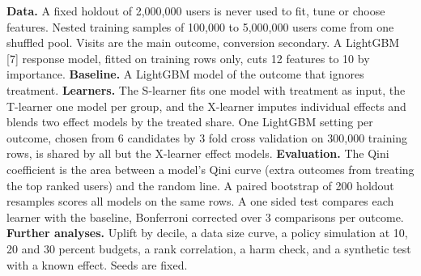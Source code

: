 \textbf{Data.} A fixed holdout of 2,000,000 users is never used to fit, tune or choose features. Nested training samples of 100,000 to 5,000,000 users come from one shuffled pool. Visits are the main outcome, conversion secondary. A LightGBM [7] response model, fitted on training rows only, cuts 12 features to 10 by importance. \textbf{Baseline.} A LightGBM model of the outcome that ignores treatment. \textbf{Learners.} The \mbox{S-learner} fits one model with treatment as input, the \mbox{T-learner} one model per group, and the \mbox{X-learner} imputes individual effects and blends two effect models by the treated share. One LightGBM setting per outcome, chosen from 6 candidates by 3 fold cross validation on 300,000 training rows, is shared by all but the \mbox{X-learner} effect models. \textbf{Evaluation.} The Qini coefficient is the area between a model's Qini curve (extra outcomes from treating the top ranked users) and the random line. A paired bootstrap of 200 holdout resamples scores all models on the same rows. A one sided test compares each learner with the baseline, Bonferroni corrected over 3 comparisons per outcome. \textbf{Further analyses.} Uplift by decile, a data size curve, a policy simulation at 10, 20 and 30 percent budgets, a rank correlation, a harm check, and a synthetic test with a known effect. Seeds are fixed.
